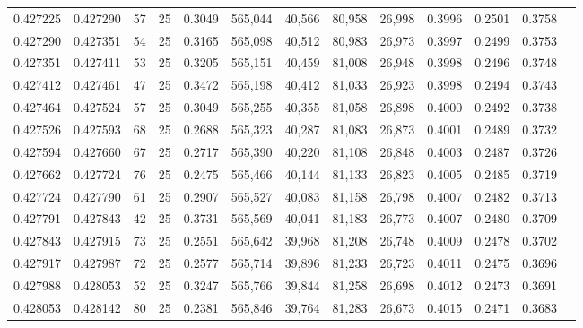 \begin{tabular}{rrrrrrrrrrrrr}
0.427225 & 0.427290 &    57 &  25 &                                     0.3049 & 565,044 &  40,566 &  80,958 &  26,998 & 0.3996 & 0.2501 & 0.3758 \\
0.427290 & 0.427351 &    54 &  25 &                                     0.3165 & 565,098 &  40,512 &  80,983 &  26,973 & 0.3997 & 0.2499 & 0.3753 \\
0.427351 & 0.427411 &    53 &  25 &                                     0.3205 & 565,151 &  40,459 &  81,008 &  26,948 & 0.3998 & 0.2496 & 0.3748 \\
0.427412 & 0.427461 &    47 &  25 &                                     0.3472 & 565,198 &  40,412 &  81,033 &  26,923 & 0.3998 & 0.2494 & 0.3743 \\
0.427464 & 0.427524 &    57 &  25 &                                     0.3049 & 565,255 &  40,355 &  81,058 &  26,898 & 0.4000 & 0.2492 & 0.3738 \\
0.427526 & 0.427593 &    68 &  25 &                                     0.2688 & 565,323 &  40,287 &  81,083 &  26,873 & 0.4001 & 0.2489 & 0.3732 \\
0.427594 & 0.427660 &    67 &  25 &                                     0.2717 & 565,390 &  40,220 &  81,108 &  26,848 & 0.4003 & 0.2487 & 0.3726 \\
0.427662 & 0.427724 &    76 &  25 &                                     0.2475 & 565,466 &  40,144 &  81,133 &  26,823 & 0.4005 & 0.2485 & 0.3719 \\
0.427724 & 0.427790 &    61 &  25 &                                     0.2907 & 565,527 &  40,083 &  81,158 &  26,798 & 0.4007 & 0.2482 & 0.3713 \\
0.427791 & 0.427843 &    42 &  25 &                                     0.3731 & 565,569 &  40,041 &  81,183 &  26,773 & 0.4007 & 0.2480 & 0.3709 \\
0.427843 & 0.427915 &    73 &  25 &                                     0.2551 & 565,642 &  39,968 &  81,208 &  26,748 & 0.4009 & 0.2478 & 0.3702 \\
0.427917 & 0.427987 &    72 &  25 &                                     0.2577 & 565,714 &  39,896 &  81,233 &  26,723 & 0.4011 & 0.2475 & 0.3696 \\
0.427988 & 0.428053 &    52 &  25 &                                     0.3247 & 565,766 &  39,844 &  81,258 &  26,698 & 0.4012 & 0.2473 & 0.3691 \\
0.428053 & 0.428142 &    80 &  25 &                                     0.2381 & 565,846 &  39,764 &  81,283 &  26,673 & 0.4015 & 0.2471 & 0.3683 \\

\end{tabular}
